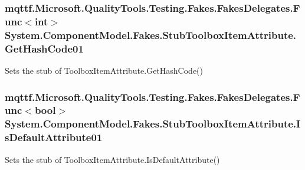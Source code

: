 \hypertarget{class_system_1_1_component_model_1_1_fakes_1_1_stub_toolbox_item_attribute_a8a6d1693053db2746407173bcc0ef499}{
\subsubsection[{Get\-Hash\-Code01}]{\setlength{\rightskip}{0pt plus 5cm}mqttf.\-Microsoft.\-Quality\-Tools.\-Testing.\-Fakes.\-Fakes\-Delegates.\-Func$<$int$>$ System.\-Component\-Model.\-Fakes.\-Stub\-Toolbox\-Item\-Attribute.\-Get\-Hash\-Code01}}\label{class_system_1_1_component_model_1_1_fakes_1_1_stub_toolbox_item_attribute_a8a6d1693053db2746407173bcc0ef499}


Sets the stub of Toolbox\-Item\-Attribute.\-Get\-Hash\-Code()

\hypertarget{class_system_1_1_component_model_1_1_fakes_1_1_stub_toolbox_item_attribute_ae4ba0663186e94924ff10dc6f2bb8969}{
\subsubsection[{Is\-Default\-Attribute01}]{\setlength{\rightskip}{0pt plus 5cm}mqttf.\-Microsoft.\-Quality\-Tools.\-Testing.\-Fakes.\-Fakes\-Delegates.\-Func$<$bool$>$ System.\-Component\-Model.\-Fakes.\-Stub\-Toolbox\-Item\-Attribute.\-Is\-Default\-Attribute01}}\label{class_system_1_1_component_model_1_1_fakes_1_1_stub_toolbox_item_attribute_ae4ba0663186e94924ff10dc6f2bb8969}


Sets the stub of Toolbox\-Item\-Attribute.\-Is\-Default\-Attribute()

